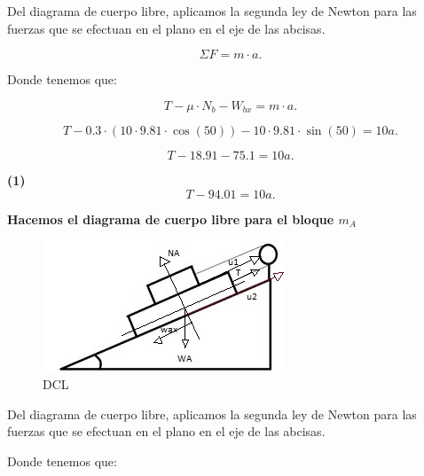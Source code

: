 \documentclass[a4paper,12pt]{article} %
\begin{document}
\begin{justify}
    Del diagrama de cuerpo libre, aplicamos la segunda ley de Newton para las fuerzas que se efectuan en el plano en el eje de las abcisas.
\end{justify}

\[\Sigma F = m \cdot a.\]

\begin{justify}
    Donde tenemos que:
\end{justify}

\[T - \mu \cdot N_b - W_{bx} = m \cdot a. \]

\[T - 0.3 \cdot \left(10 \cdot 9.81 \cdot \cos (50)\right) - 10 \cdot 9.81 \cdot \sin (50) = 10a.\]

\[T - 18.91 - 75.1 = 10a.\]

\textbf{(1)} \[ T - 94.01 = 10a.\]

\newpage

\begin{justify}
    \textbf{Hacemos el diagrama de cuerpo libre para el bloque \(m_A\)}
\end{justify}

\begin{figure}[h!]
    \centering
    \includegraphics[width=\textwidth]{Bloque a.jpg}
    \caption{DCL}
\end{figure}

\begin{justify}
    Del diagrama de cuerpo libre, aplicamos la segunda ley de Newton para las fuerzas que se efectuan en el plano en el eje de las abcisas.
\end{justify}

\begin{justify}
    Donde tenemos que:
\end{justify}


\end{document}
